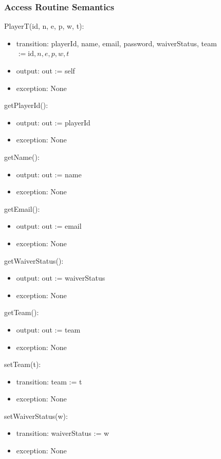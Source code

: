\documentclass[12pt, titlepage]{article}
\begin{document}
\subsubsection{Access Routine Semantics}

\noindent PlayerT(id, n, e, p, w, t):
\begin{itemize}
  \item transition: playerId, name, email, password, waiverStatus, team $:= \text{id}, n, e, p, w, t$
  \item output: out := self
  \item exception: None
\end{itemize}

\noindent getPlayerId():
\begin{itemize}
  \item output: out := playerId
  \item exception: None
\end{itemize}

\noindent getName():
\begin{itemize}
  \item output: out := name
  \item exception: None
\end{itemize}

\noindent getEmail():
\begin{itemize}
  \item output: out := email
  \item exception: None
\end{itemize}

\noindent getWaiverStatus():
\begin{itemize}
  \item output: out := waiverStatus
  \item exception: None
\end{itemize}

\noindent getTeam():
\begin{itemize}
  \item output: out := team
  \item exception: None
\end{itemize}

\noindent setTeam(t):
\begin{itemize}
  \item transition: team := t
  \item exception: None
\end{itemize}

\noindent setWaiverStatus(w):
\begin{itemize}
  \item transition: waiverStatus := w
  \item exception: None
\end{itemize}
\end{document}

